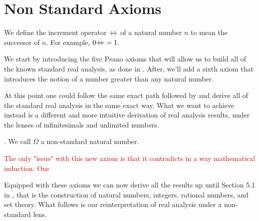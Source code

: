 \section{Non Standard Axioms}
We define the increment operator $\mathord{+\!\!+}$ of a natural number $n$ to mean the successor of $n$. For example, $0\mathord{+\!\!+}=1$.

We start by introducing the five Peano axioms that will allow us to build all of the known standard real analysis, as done in \cite{tao2022analysis}. After, we'll add a sixth axiom that introduces the notion of a number greater than any natural number. 
\newline

At this point one could follow the same exact path followed by \cite{tao2022analysis} and derive all of the standard real analysis in the same exact way. What we want to achieve instead is a different and more intuitive derivation of real analysis results, under the lenses of infinitesimals and unlimited numbers. 

. We call $\Omega$ a non-standard natural number. 
\newline

\textcolor{red}{The only "issue" with this new axiom is that it contradicts in a way mathematical induction. One }

Equipped with these axioms we can now derive all the results up until Section 5.1 in \cite{tao2022analysis}, that is the construction of natural numbers, integers, rational numbers, and set theory. What follows is our reinterpretation of real analysis under a non-standard lens.
